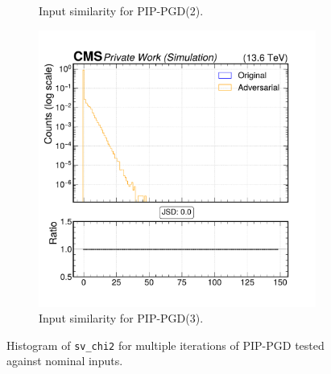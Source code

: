 \begin{figure}[h]
\begin{subfigure}[t]{0.32\textwidth}
    \caption*{Input similarity for PIP-PGD(2).}
  \end{subfigure}\hfill
  \begin{subfigure}[t]{0.32\textwidth}
    \includegraphics[width=\linewidth]{media/output/features/compare/combined_it_3/cmp_vtx_arr_sv_chi2.pdf}
    \caption*{Input similarity for PIP-PGD(3).}
  \end{subfigure}

  \caption*{Histogram of \texttt{sv\_chi2} for multiple iterations of PIP-PGD tested against nominal inputs.}
  \label{fig:combined_input_sv_chi2}
\end{figure}


